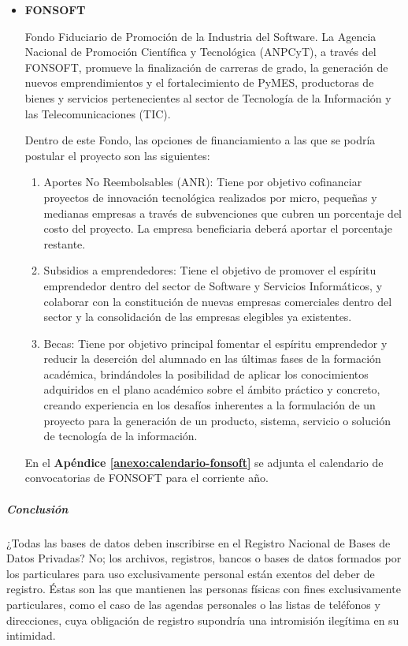 \begin{itemize}
    \item \textbf{FONSOFT}
    
    Fondo Fiduciario de Promoción de la Industria del Software. La Agencia Nacional de Promoción Científica y Tecnológica (ANPCyT), a través del FONSOFT, promueve la finalización de carreras de grado, la generación de nuevos emprendimientos y el fortalecimiento de PyMES, productoras de bienes y servicios pertenecientes al sector de Tecnología de la Información y las Telecomunicaciones (TIC).
    
    Dentro de este Fondo, las opciones de financiamiento a las que se podría postular el proyecto son las siguientes:
    \begin{enumerate}
		\item Aportes No Reembolsables (ANR):
Tiene por objetivo cofinanciar proyectos de innovación tecnológica realizados por micro, pequeñas y medianas empresas a través de subvenciones que cubren un porcentaje del costo del proyecto. La empresa beneficiaria deberá aportar el porcentaje restante.
		\item Subsidios a emprendedores:
Tiene el objetivo de promover el espíritu emprendedor dentro del sector de Software y Servicios Informáticos, y colaborar con la constitución de nuevas empresas comerciales dentro del sector y la consolidación de las empresas elegibles ya existentes. 
		\item Becas:
Tiene por objetivo principal fomentar el espíritu emprendedor y reducir la deserción del alumnado en las últimas fases de la formación académica, brindándoles la posibilidad de aplicar los conocimientos adquiridos en el plano académico sobre el ámbito práctico y concreto, creando experiencia en los desafíos inherentes a la formulación de un proyecto para la generación de un producto, sistema, servicio o solución de tecnología de la información. 
	\end{enumerate}
    
    En el \textbf{Apéndice \ref{anexo:calendario-fonsoft}} se adjunta el calendario de convocatorias de FONSOFT para el corriente año.

    \end{itemize}


\subparagraph{Conclusión}

¿Todas las bases de datos deben inscribirse en el Registro Nacional de Bases de Datos Privadas?
No; los archivos, registros, bancos o bases de datos formados por los particulares para uso exclusivamente personal están exentos del deber de registro.
Éstas son las que mantienen las personas físicas con fines exclusivamente particulares, como el caso de las agendas personales o las listas de teléfonos y direcciones, cuya obligación de registro supondría una intromisión ilegítima en su intimidad.

